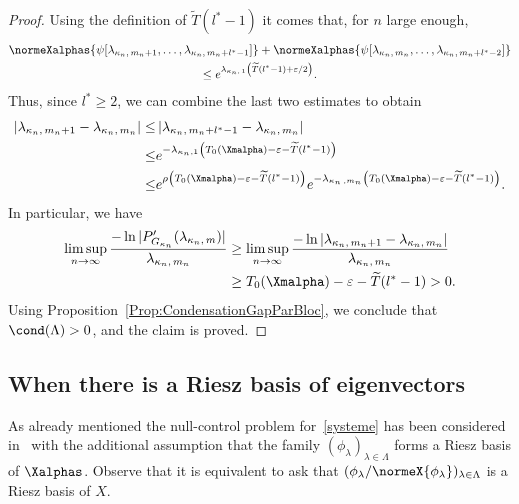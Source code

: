 \begin{proof}
Using the definition of $\widetilde{T}(l^*-1)$ it comes that, for $n$ large enough,
\begin{multline*}
\normeXalphas{ \psi[\lambda_{\kappa_n,\,m_n+1},\dots,\lambda_{\kappa_n,\,m_n+l^*-1}] } + \normeXalphas{ \psi[\lambda_{\kappa_n,\,m_n},\dots,\lambda_{\kappa_n,\,m_n+l^*-2}] } \\
\leq e^{\lambda_{\kappa_n,\,1} \left(\widetilde{T}(l^*-1) + \varepsilon/2\right)}.
\end{multline*}
Thus, since $l^*\geq 2$, we can combine the last two estimates to obtain
\begin{equation*}
\begin{aligned}
\left| \lambda_{\kappa_n,\,m_n+1} - \lambda_{\kappa_n,\,m_n} \right| \leq & \left| \lambda_{\kappa_n,\,m_n+l^*-1} - \lambda_{\kappa_n,\,m_n} \right| \\
\leq & e^{-\lambda_{\kappa_n,1} \left(T_0(\Xmalpha)-\varepsilon - \widetilde{T}(l^*-1)\right)}\\
\leq & e^{\rho\left(T_0(\Xmalpha)-\varepsilon - \widetilde{T}(l^*-1)\right)} e^{-\lambda_{\kappa_n\,,m_n} \left(T_0(\Xmalpha)-\varepsilon - \widetilde{T}(l^*-1)\right)}.
\end{aligned}
\end{equation*}
In particular, we have
\begin{align*}
\limsup_{n \to \infty} \frac{-\ln |P_{G_{\kappa_n}}'(\lambda_{\kappa_n,\,m}) |}{\lambda_{\kappa_n,\,m_n}}& \geq \limsup_{n \to \infty} \frac{-\ln |\lambda_{\kappa_n,\,m_n+1} - \lambda_{\kappa_n,\,m_n}|}{\lambda_{\kappa_n,\,m_n}} \\
& \geq T_0(\Xmalpha)-\varepsilon - \widetilde{T}(l^*-1) > 0.
\end{align*}
Using Proposition~\ref{Prop:CondensationGapParBloc}, we conclude that $\cond(\Lambda)>0$, and the claim is proved.
\end{proof}



\subsection{When there is a Riesz basis of eigenvectors} \label{Subsec:BaseRiesz}


As already mentioned the null-control problem for~\eqref{systeme} has been considered in~\cite{AmmarKhodjaBenabdallahGonzalez-BurgosdeTeresa:2014} with the additional assumption that the family $(\phi_\lambda)_{\lambda\in \Lambda}$ forms a Riesz basis of $\Xalphas$. Observe that it is equivalent to ask that $(\phi_\lambda/\normeX{\phi_\lambda})_{\lambda\in \Lambda}$ is a Riesz basis of $X$.

